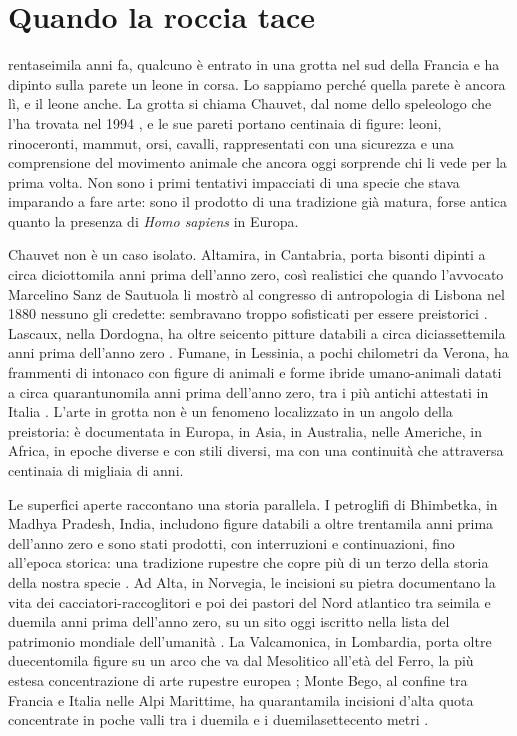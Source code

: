 \chapter{Quando la roccia tace}
\label{cap:apertura}

rentaseimila anni fa, qualcuno è entrato in una grotta nel sud della Francia e ha dipinto sulla parete un leone in corsa. Lo sappiamo perché quella parete è ancora lì, e il leone anche. La grotta si chiama Chauvet, dal nome dello speleologo che l'ha trovata nel 1994 \citep{chauvet1995}, e le sue pareti portano centinaia di figure: leoni, rinoceronti, mammut, orsi, cavalli, rappresentati con una sicurezza e una comprensione del movimento animale che ancora oggi sorprende chi li vede per la prima volta. Non sono i primi tentativi impacciati di una specie che stava imparando a fare arte: sono il prodotto di una tradizione già matura, forse antica quanto la presenza di \textit{Homo sapiens} in Europa.

Chauvet non è un caso isolato. Altamira, in Cantabria, porta bisonti dipinti a circa diciottomila anni prima dell'anno zero, così realistici che quando l'avvocato Marcelino Sanz de Sautuola li mostrò al congresso di antropologia di Lisbona nel 1880 nessuno gli credette: sembravano troppo sofisticati per essere preistorici \citep{leroi_gourhan1965}. Lascaux, nella Dordogna, ha oltre seicento pitture databili a circa diciassettemila anni prima dell'anno zero \citep{leroi_gourhan1965}. Fumane, in Lessinia, a pochi chilometri da Verona, ha frammenti di intonaco con figure di animali e forme ibride umano-animali datati a circa quarantunomila anni prima dell'anno zero, tra i più antichi attestati in Italia \citep{broglio2003, broglio2005}. L'arte in grotta non è un fenomeno localizzato in un angolo della preistoria: è documentata in Europa, in Asia, in Australia, nelle Americhe, in Africa, in epoche diverse e con stili diversi, ma con una continuità che attraversa centinaia di migliaia di anni.

Le superfici aperte raccontano una storia parallela. I petroglifi di Bhimbetka, in Madhya Pradesh, India, includono figure databili a oltre trentamila anni prima dell'anno zero e sono stati prodotti, con interruzioni e continuazioni, fino all'epoca storica: una tradizione rupestre che copre più di un terzo della storia della nostra specie \citep{wakankar1985}. Ad Alta, in Norvegia, le incisioni su pietra documentano la vita dei cacciatori-raccoglitori e poi dei pastori del Nord atlantico tra seimila e duemila anni prima dell'anno zero, su un sito oggi iscritto nella lista del patrimonio mondiale dell'umanità \citep{helskog1988}. La Valcamonica, in Lombardia, porta oltre duecentomila figure su un arco che va dal Mesolitico all'età del Ferro, la più estesa concentrazione di arte rupestre europea \citep{demarinis2012}; Monte Bego, al confine tra Francia e Italia nelle Alpi Marittime, ha quarantamila incisioni d'alta quota concentrate in poche valli tra i duemila e i duemilasettecento metri \citep{lumley1995}.

